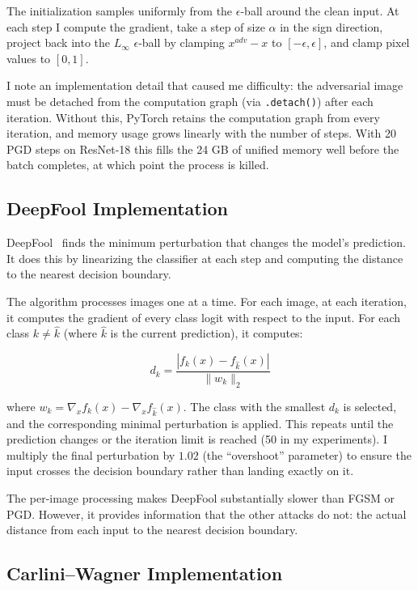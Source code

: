 The initialization samples uniformly from the $\epsilon$-ball around the clean input. At each step I compute the gradient, take a step of size $\alpha$ in the sign direction, project back into the $L_\infty$ $\epsilon$-ball by clamping $x^{adv} - x$ to $[-\epsilon, \epsilon]$, and clamp pixel values to $[0, 1]$.

I note an implementation detail that caused me difficulty: the adversarial image must be detached from the computation graph (via \texttt{.detach()}) after each iteration. Without this, PyTorch retains the computation graph from every iteration, and memory usage grows linearly with the number of steps. With 20 PGD steps on ResNet-18 this fills the 24 GB of unified memory well before the batch completes, at which point the process is killed.

\subsection{DeepFool Implementation}

DeepFool~\cite{moosavidezfooli2016deepfool} finds the minimum perturbation that changes the model's prediction. It does this by linearizing the classifier at each step and computing the distance to the nearest decision boundary.

The algorithm processes images one at a time. For each image, at each iteration, it computes the gradient of every class logit with respect to the input. For each class $k \neq \hat{k}$ (where $\hat{k}$ is the current prediction), it computes:

\begin{equation}
    d_k = \frac{|f_k(x) - f_{\hat{k}}(x)|}{\|w_k\|_2}
\end{equation}

where $w_k = \nabla_x f_k(x) - \nabla_x f_{\hat{k}}(x)$. The class with the smallest $d_k$ is selected, and the corresponding minimal perturbation is applied. This repeats until the prediction changes or the iteration limit is reached (50 in my experiments). I multiply the final perturbation by $1.02$ (the ``overshoot'' parameter) to ensure the input crosses the decision boundary rather than landing exactly on it.

The per-image processing makes DeepFool substantially slower than FGSM or PGD. However, it provides information that the other attacks do not: the actual distance from each input to the nearest decision boundary.

\subsection{Carlini--Wagner Implementation}

